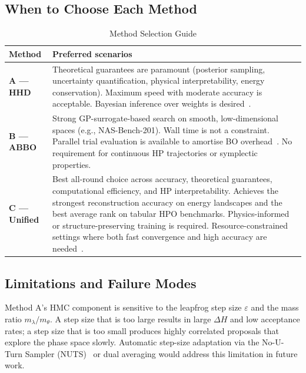 \documentclass[11pt]{article}
\begin{document}
\subsection{When to Choose Each Method}

\begin{table}[H]
\centering
\caption{Method Selection Guide}
\label{tab:guide}
\renewcommand{\arraystretch}{1.35}
\begin{tabular}{p{1.8cm}p{5.5cm}}
\toprule
\textbf{Method} & \textbf{Preferred scenarios} \\
\midrule
\textbf{A — HHD} & Theoretical guarantees are paramount (posterior
sampling, uncertainty quantification, physical interpretability,
energy conservation).  Maximum speed with moderate accuracy is
acceptable.  Bayesian inference over weights is desired~\cite{betancourt2017}. \\
\midrule
\textbf{B — ABBO} & Strong GP-surrogate-based search on smooth,
low-dimensional spaces (e.g., NAS-Bench-201).  Wall time is not a
constraint.  Parallel trial evaluation is available to amortise BO
overhead~\cite{snoek2012}.  No requirement for continuous HP
trajectories or symplectic properties. \\
\midrule
\textbf{C — Unified} & Best all-round choice across accuracy,
theoretical guarantees, computational efficiency, and HP
interpretability.  Achieves the strongest reconstruction accuracy
on energy landscapes and the best average rank on tabular HPO
benchmarks.  Physics-informed or structure-preserving training
is required.  Resource-constrained settings where both fast
convergence and high accuracy are needed~\cite{kiyani2025}. \\
\bottomrule
\end{tabular}
\end{table}

\subsection{Limitations and Failure Modes}

Method A's HMC component is sensitive to the leapfrog step size
$\varepsilon$ and the mass ratio $m_\lambda / m_\theta$.  A step size
that is too large results in large $\Delta H$ and low acceptance rates;
a step size that is too small produces highly correlated proposals that
explore the phase space slowly.  Automatic step-size adaptation via the
No-U-Turn Sampler (NUTS)~\cite{betancourt2017} or dual averaging would
address this limitation in future work.
\end{document}
